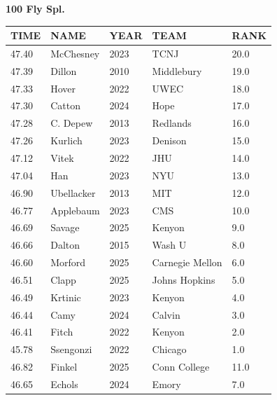 \begin{table}[H]
\centering
\begin{minipage}[t]{0.6\textwidth}
\centering
\textbf{100 Fly Spl.}\\[0.1cm]
\begin{tabular}{@{}p{1.8cm}p{2.8cm}p{1.2cm}p{1.4cm}p{0.8cm}@{}}
\hline
    \textbf{TIME} & \textbf{NAME} & \textbf{YEAR} & \textbf{TEAM} & \textbf{RANK} \\
\hline
    47.40 & McChesney & 2023 & TCNJ & 20.0 \\
    47.39 & Dillon & 2010 & Middlebury & 19.0 \\
    47.33 & Hover & 2022 & UWEC & 18.0 \\
    47.30 & Catton & 2024 & Hope & 17.0 \\
    47.28 & C. Depew & 2013 & Redlands & 16.0 \\
    47.26 & Kurlich & 2023 & Denison & 15.0 \\
    47.12 & Vitek & 2022 & JHU & 14.0 \\
    47.04 & Han & 2023 & NYU & 13.0 \\
    46.90 & Ubellacker & 2013 & MIT & 12.0 \\
    46.77 & Applebaum & 2023 & CMS & 10.0 \\
    46.69 & Savage & 2025 & Kenyon & 9.0 \\
    46.66 & Dalton & 2015 & Wash U & 8.0 \\
    46.60 & Morford & 2025 & Carnegie Mellon & 6.0 \\
    46.51 & Clapp & 2025 & Johns Hopkins & 5.0 \\
    46.49 & Krtinic & 2023 & Kenyon & 4.0 \\
    46.44 & Camy & 2024 & Calvin & 3.0 \\
    46.41 & Fitch & 2022 & Kenyon & 2.0 \\
    45.78 & Ssengonzi & 2022 & Chicago & 1.0 \\
    46.82 & Finkel & 2025 & Conn College & 11.0 \\
    46.65 & Echols & 2024 & Emory & 7.0 \\
\hline
\end{tabular}
\end{minipage}
\end{table}


\newpage

